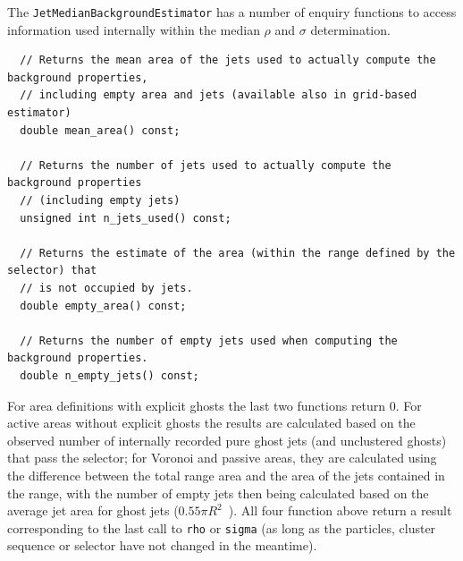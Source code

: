 \documentclass[12pt,a4]{article}
\newcommand{\ttt}[1]{{\small\texttt{#1}}}
\begin{document}
The \ttt{JetMedianBackgroundEstimator} has a number of enquiry
functions to access information used internally within the median
$\rho$ and $\sigma$ determination.
\begin{lstlisting}
  // Returns the mean area of the jets used to actually compute the background properties,
  // including empty area and jets (available also in grid-based estimator)
  double mean_area() const;
   
  // Returns the number of jets used to actually compute the background properties
  // (including empty jets)
  unsigned int n_jets_used() const;
   
  // Returns the estimate of the area (within the range defined by the selector) that
  // is not occupied by jets.
  double empty_area() const;
   
  // Returns the number of empty jets used when computing the background properties. 
  double n_empty_jets() const;
\end{lstlisting}
For area definitions with explicit ghosts the last two functions
return $0$.
%
For active areas without explicit ghosts the results are calculated
based on the observed number of internally recorded pure ghost jets
(and unclustered ghosts) that pass the selector; for Voronoi and
passive areas, they are calculated using the difference between the
total range area and the area of the jets contained in the range, with
the number of empty jets then being calculated based on the average
jet area for ghost jets ($0.55\pi R^2$~\cite{CSSAreas}).
%
All four function above return a result corresponding to the last call
to \ttt{rho} or \ttt{sigma} (as long as the particles, cluster sequence or
selector have not changed in the meantime).

\end{document}
